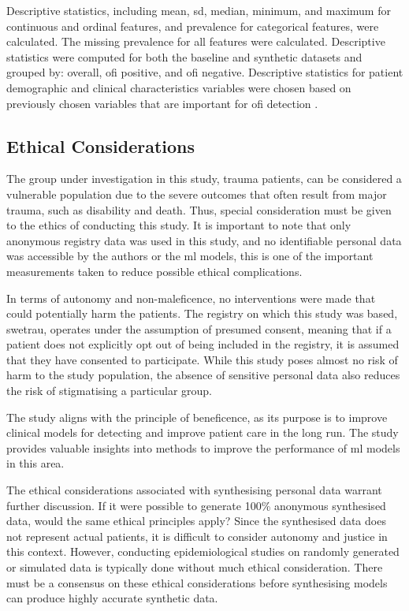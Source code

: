\documentclass[12pt, a4paper]{article}
\begin{document}
Descriptive statistics, including mean, \acrfull{sd}, median, minimum, and maximum for continuous and ordinal features,
and prevalence for categorical features, were calculated. The missing prevalence for all features were calculated.
Descriptive statistics were computed for both the baseline and synthetic datasets and grouped by: overall,
\acrshort{ofi} positive, and \acrshort{ofi} negative. Descriptive statistics for patient demographic and clinical
characteristics variables were chosen based on previously chosen variables that are important for \acrshort{ofi}
detection \cite{attergrim_predicting_2023}.

\subsection{Ethical Considerations}
The group under investigation in this study, trauma patients, can be considered a vulnerable population due to the
severe outcomes that often result from major trauma, such as disability and death. Thus, special consideration must be
given to the ethics of conducting this study. It is important to note that only anonymous registry data was used in
this study, and no identifiable personal data was accessible by the authors or the \acrshort{ml} models, this is one of
the important measurements taken to reduce possible ethical complications.

In terms of autonomy and non-maleficence, no interventions were made that could potentially harm the patients. The
registry on which this study was based, \acrshort{swetrau}, operates under the assumption of presumed consent, meaning
that if a patient does not explicitly opt out of being included in the registry, it is assumed that they have consented
to participate. While this study poses almost no risk of harm to the study population, the absence of sensitive
personal data also reduces the risk of stigmatising a particular group.

The study aligns with the principle of beneficence, as its purpose is to improve clinical models for detecting
 and improve patient care in the long run. The study provides valuable insights into methods to improve
the performance of \acrshort{ml} models in this area.

The ethical considerations associated with synthesising personal data warrant further discussion. If it were possible
to generate 100\% anonymous synthesised data, would the same ethical principles apply? Since the synthesised data does
not represent actual patients, it is difficult to consider autonomy and justice in this context. However, conducting
epidemiological studies on randomly generated or simulated data is typically done without much ethical consideration.
There must be a consensus on these ethical considerations before synthesising models can produce highly accurate
synthetic data.
\end{document}
